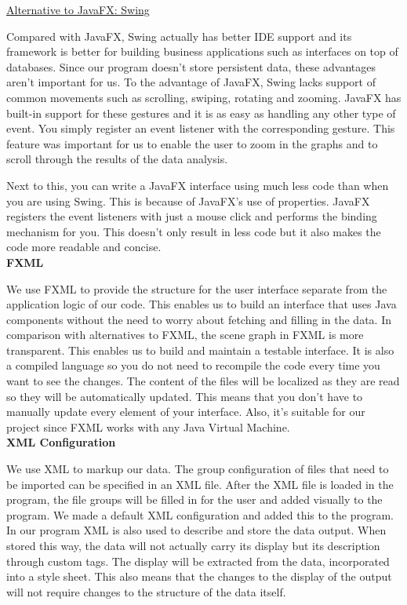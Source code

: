 \documentclass[a4paper,english,fleqn]{exam}
\begin{document}
\newpage 

\underline{Alternative to JavaFX: Swing}

Compared with JavaFX, Swing actually has better IDE support and its framework is better for building business applications such as interfaces on top of databases. Since our program doesn't store persistent data, these advantages aren't important for us. To the advantage of JavaFX, Swing lacks support of common movements such as scrolling, swiping, rotating and zooming. JavaFX has built-in support for these gestures and it is as easy as handling any other type of event. You simply register an event listener with the corresponding gesture. This feature was important for us to enable the user to zoom in the graphs and to scroll through the results of the data analysis. 

Next to this, you can write a JavaFX interface using much less code than when you are using Swing. This is because of JavaFX's use of properties. JavaFX registers the event listeners with just a mouse click and performs the binding mechanism for you. This doesn't only result in less code but it also makes the code more readable and concise. 
\\

\textbf{FXML} 

We use FXML to provide the structure for the user interface separate from the application logic of our code. This enables us to build an interface that uses Java components without the need to worry about fetching and filling in the data. In comparison with alternatives to FXML, the scene graph in FXML is more transparent. This enables us to build and maintain a testable interface. It is also a compiled language so you do not need to recompile the code every time you want to see the changes. The content of the files will be localized as they are read so they will be automatically updated. This means that you don't have to manually update every element of your interface. Also, it's suitable for our project since FXML works with any Java Virtual Machine.
\\

\textbf{XML Configuration} 

We use XML to markup our data. The group configuration of files that need to be imported can be specified in an XML file. After the XML file is loaded in the program, the file groups will be filled in for the user and added visually to the program. We made a default XML configuration and added this to the program. In our program XML is also used to describe and store the data output. When stored this way, the data will not actually carry its display but its description through custom tags. The display will be extracted from the data, incorporated into a style sheet. This also means that the changes to the display of the output will not require changes to the structure of the data itself.
\end{document}
